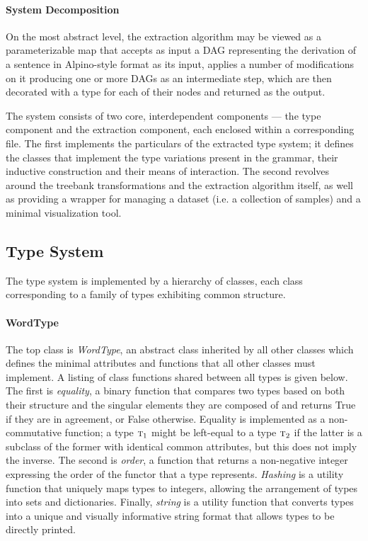 \paragraph{System Decomposition}
On the most abstract level, the extraction algorithm may be viewed as a parameterizable map that accepts as input a DAG representing the derivation of a sentence in Alpino-style format as its input, applies a number of modifications on it producing one or more DAGs as an intermediate step, which are then decorated with a type for each of their nodes and returned as the output.

The system consists of two core, interdependent components --- the type component and the extraction component, each enclosed within a corresponding file.
The first implements the particulars of the extracted type system; it defines the classes that implement the type variations present in the grammar, their inductive construction and their means of interaction. 
The second revolves around the treebank transformations and the extraction algorithm itself, as well as providing a wrapper for managing a dataset (i.e. a collection of samples) and a minimal visualization tool.

\subsection{Type System}
The type system is implemented by a hierarchy of classes, each class corresponding to a family of types exhibiting common structure.

\paragraph{WordType} The top class is \textit{WordType}, an abstract class inherited by all other classes which defines the minimal attributes and functions that all other classes must implement.
A listing of class functions shared between all types is given below.
The first is \textit{equality}, a binary function that compares two types based on both their structure and the singular elements they are composed of and returns True if they are in agreement, or False otherwise.
Equality is implemented as a non-commutative function; a type $\textsc{t}_1$ might be left-equal to a type $\textsc{t}_2$ if the latter is a subclass of the former with identical common attributes, but this does not imply the inverse.
The second is \textit{order}, a function that returns a non-negative integer expressing the order of the functor that a type represents.
\textit{Hashing} is a utility function that uniquely maps types to integers, allowing the arrangement of types into sets and dictionaries.
Finally, \textit{string} is a utility function that converts types into a unique and visually informative string format that allows types to be directly printed.

